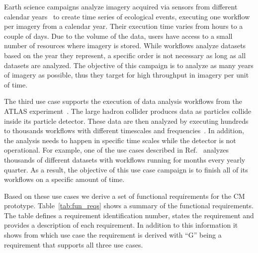 Earth science campaigns analyze imagery acquired via sensors from different 
calendar years~\cite{paraskevakos2019workflow} to create time series of 
ecological events, executing one workflow per imagery from a calendar year.
Their execution time varies from hours to a couple of days. Due to the volume 
of the data, users have access to a small number of resources where imagery is 
stored. While workflows analyze datasets based on the year they represent, a 
specific order is not necessary as long as all datasets are analyzed. The 
objective of this campaign is to analyze as many years of imagery as possible, 
thus they target for high throughput in imagery per unit of time.

The third use case supports the execution of data analysis workflows from the 
ATLAS experiment~\cite{atlas}. The large hadron collider produces data as 
particles collide inside its particle detector. These data are then analyzed 
by executing hundreds to thousands workflows with different timescales and 
frequencies~\cite{borodin2015big}. In addition, the analysis needs to happen 
in specific time scales while the detector is not operational. For example, 
one of the use cases described in Ref.~\cite{borodin2015big} analyzes 
thousands of different datasets with workflows running for months every yearly 
quarter. As a result, the objective of this use case campaign is to finish all 
of its workflows on a specific amount of time.

Based on these use cases we derive a set of functional requirements for the 
CM prototype. Table~\ref{tab:fun_reqs} shows a summary of the 
functional requirements. The table defines a requirement identification 
number, states the requirement and provides a description of each requirement.
In addition to this information it shows from which use case the requirement 
is derived with ``G'' being a requirement that supports all three use cases. 

